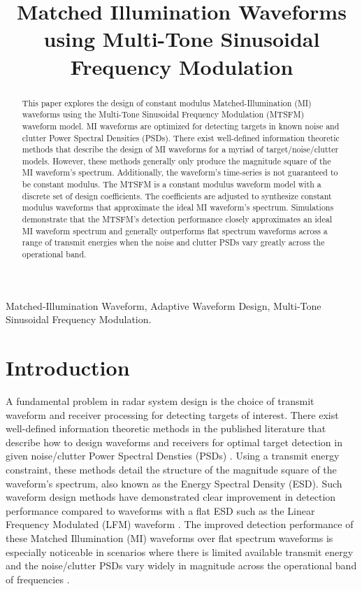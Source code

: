 \documentclass{article}
\title{Matched Illumination Waveforms using Multi-Tone Sinusoidal Frequency Modulation}
\begin{document}
%
\maketitle
%
\begin{abstract}
This paper explores the design of constant modulus Matched-Illumination (MI) waveforms using the Multi-Tone Sinusoidal Frequency Modulation (MTSFM) waveform model.  MI waveforms are optimized for detecting targets in known noise and clutter Power Spectral Densities (PSDs).  There exist well-defined information theoretic methods that describe the design of MI waveforms for a myriad of target/noise/clutter models.  However, these methods generally only produce the magnitude square of the MI waveform's spectrum. Additionally, the waveform's time-series is not guaranteed to be constant modulus. The MTSFM is a constant modulus waveform model with a discrete set of design coefficients. The coefficients are adjusted to synthesize constant modulus waveforms that approximate the ideal MI waveform's spectrum.  Simulations demonstrate that the MTSFM's detection performance closely approximates an ideal MI waveform spectrum and generally outperforms flat spectrum waveforms across a range of transmit energies when the noise and clutter PSDs vary greatly across the operational band. 

\end{abstract}
%
\begin{keywords}
Matched-Illumination Waveform, Adaptive Waveform Design, Multi-Tone Sinusoidal Frequency Modulation. 
\end{keywords}
%
\section{Introduction}
\label{sec:intro}
A fundamental problem in radar system design is the choice of transmit waveform and receiver processing for detecting targets of interest.  There exist well-defined information theoretic methods in the published literature that describe how to design waveforms and receivers for optimal target detection in given noise/clutter Power Spectral Densties (PSDs) \cite{MRBell_Info, Romero, pillai2000optimal, Kay2007, pillai1999, Guerci2000}.  Using a transmit energy constraint, these methods detail the structure of the magnitude square of the waveform's spectrum, also known as the Energy Spectral Density (ESD).  Such waveform design methods have demonstrated clear improvement in detection performance compared to waveforms with a flat ESD such as the Linear Frequency Modulated (LFM) waveform \cite{Kay2007, pillai1999}.  The improved detection performance of these Matched Illumination (MI) waveforms over flat spectrum waveforms is especially noticeable in scenarios where there is limited available transmit energy and the noise/clutter PSDs vary widely in magnitude across the operational band of frequencies \cite{pillai1999}.
\end{document}
